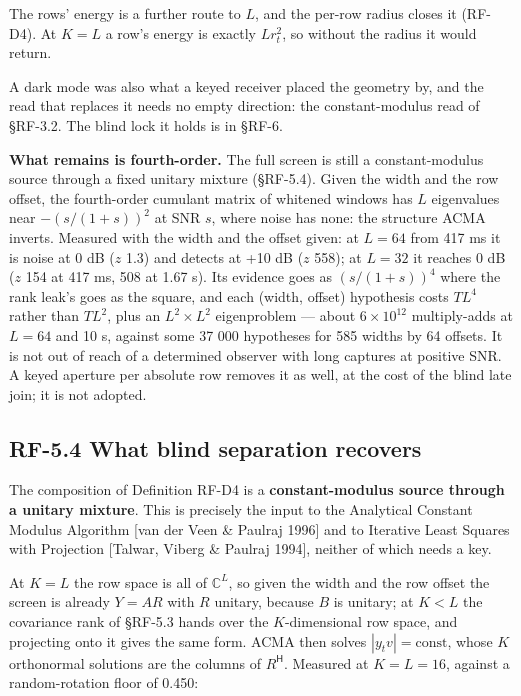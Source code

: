 \documentclass[10pt,letterpaper,twocolumn]{article}
\begin{document}
The rows' energy is a further route to \(L\), and the per-row radius closes it (RF-D4). At \(K = L\) a row's energy is exactly \(L r_t^2\), so without the radius it would return.

A dark mode was also what a keyed receiver placed the geometry by, and the read that replaces it needs no empty direction: the constant-modulus read of §RF-3.2. The blind lock it holds is in §RF-6.

\textbf{What remains is fourth-order.} The full screen is still a constant-modulus source through a fixed unitary mixture (§RF-5.4). Given the width and the row offset, the fourth-order cumulant matrix of whitened windows has \(L\) eigenvalues near \(-(s/(1+s))^2\) at SNR \(s\), where noise has none: the structure ACMA inverts. Measured with the width and the offset given: at \(L = 64\) from 417 ms it is noise at 0 dB (\(z\) 1.3) and detects at +10 dB (\(z\) 558); at \(L = 32\) it reaches 0 dB (\(z\) 154 at 417 ms, 508 at 1.67 s). Its evidence goes as \((s/(1+s))^4\) where the rank leak's goes as the square, and each (width, offset) hypothesis costs \(T L^4\) rather than \(T L^2\), plus an \(L^2 \times L^2\) eigenproblem --- about \(6\times10^{12}\) multiply-adds at \(L = 64\) and 10 s, against some 37 000 hypotheses for 585 widths by 64 offsets. It is not out of reach of a determined observer with long captures at positive SNR. A keyed aperture per absolute row removes it as well, at the cost of the blind late join; it is not adopted.

\subsection{RF-5.4 What blind separation recovers}\label{rf-54-what-blind-separation-recovers}

The composition of Definition RF-D4 is
a \textbf{constant-modulus source through a unitary mixture}. This is precisely the input to the Analytical Constant Modulus Algorithm {[}van der Veen \& Paulraj 1996{]} and to Iterative Least Squares with Projection {[}Talwar, Viberg \& Paulraj 1994{]}, neither of which needs a key.

At \(K = L\) the row space is all of \(\mathbb{C}^L\), so given the width and the row offset the screen is already \(Y = AR\) with \(R\) unitary, because \(B\) is unitary; at \(K < L\) the covariance rank of §RF-5.3 hands over the \(K\)-dimensional row space, and projecting onto it gives the same form. ACMA then solves \(|y_t v| = \text{const}\), whose \(K\) orthonormal solutions are the columns of \(R^{\mathsf H}\). Measured at \(K = L = 16\), against a random-rotation floor of 0.450:
\end{document}
